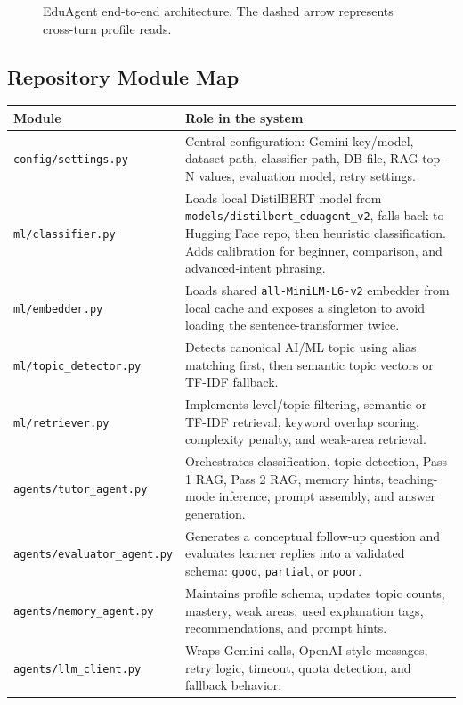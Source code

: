 \documentclass[11pt,a4paper]{article}
\begin{document}
\begin{figure}[H]
{}
\caption{EduAgent end-to-end architecture. The dashed arrow represents cross-turn profile reads.}
\label{fig:pipeline}
\end{figure}

\subsection{Repository Module Map}

\begin{longtable}{p{}p{}}
\toprule
\textbf{Module} & \textbf{Role in the system} \\
\midrule
\endhead
\texttt{config/settings.py} & Central configuration: Gemini key/model, dataset path, classifier path, DB file, RAG top-N values, evaluation model, retry settings. \\
\texttt{ml/classifier.py} & Loads local DistilBERT model from \texttt{models/distilbert\_eduagent\_v2}, falls back to Hugging Face repo, then heuristic classification. Adds calibration for beginner, comparison, and advanced-intent phrasing. \\
\texttt{ml/embedder.py} & Loads shared \texttt{all-MiniLM-L6-v2} embedder from local cache and exposes a singleton to avoid loading the sentence-transformer twice. \\
\texttt{ml/topic\_detector.py} & Detects canonical AI/ML topic using alias matching first, then semantic topic vectors or TF-IDF fallback. \\
\texttt{ml/retriever.py} & Implements level/topic filtering, semantic or TF-IDF retrieval, keyword overlap scoring, complexity penalty, and weak-area retrieval. \\
\texttt{agents/tutor\_agent.py} & Orchestrates classification, topic detection, Pass 1 RAG, Pass 2 RAG, memory hints, teaching-mode inference, prompt assembly, and answer generation. \\
\texttt{agents/evaluator\_agent.py} & Generates a conceptual follow-up question and evaluates learner replies into a validated schema: \texttt{good}, \texttt{partial}, or \texttt{poor}. \\
\texttt{agents/memory\_agent.py} & Maintains profile schema, updates topic counts, mastery, weak areas, used explanation tags, recommendations, and prompt hints. \\
\texttt{agents/llm\_client.py} & Wraps Gemini calls, OpenAI-style messages, retry logic, timeout, quota detection, and fallback behavior. \\

\end{longtable}
\end{document}
